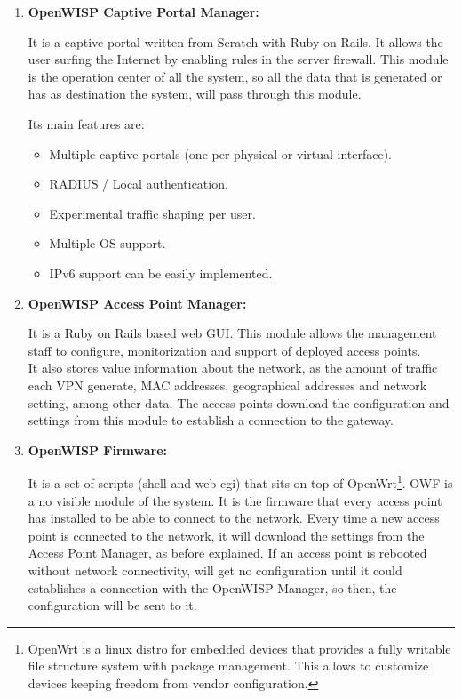 \documentclass[draftclsnofoot,12pt,journal,onecolumn]{IEEEtran}
\begin{document}
\begin{enumerate}
\item[\fbox{3}]\textbf{OpenWISP Captive Portal Manager:}

It is a captive portal written from Scratch with Ruby on Rails. It allows the user surfing the Internet by enabling rules in the server firewall. This module is the operation center of all the system, so all the data that is generated or has as destination the system, will pass through this module. 

Its main features are:
\begin{itemize}
\item Multiple captive portals (one per physical or virtual interface).
\item RADIUS / Local authentication.
\item Experimental traffic shaping per user.
\item Multiple OS support.
\item IPv6 support can be easily implemented.
\end{itemize}


\item[\fbox{4}]\textbf{OpenWISP Access Point Manager:}

It is a Ruby on Rails based web GUI. This module allows the management staff to configure, monitorization and support of deployed access points.\\ It also stores value information about the network, as the amount of traffic each VPN generate, MAC addresses, geographical addresses and network setting, among other data. The access points download the configuration and settings from this module to establish a connection to the gateway.  


\item[\fbox{5}]\textbf{OpenWISP Firmware:}

It is a set of scripts (shell and web cgi) that sits on top of OpenWrt\footnote{OpenWrt is a linux distro for embedded devices that provides a fully writable file structure system with package management. This allows to customize devices keeping freedom from vendor configuration.}. OWF is a no visible module of the system. It is the firmware that every access point has installed to be able to connect to the network. Every time a new access point is connected to the network, it will download the settings from the Access Point Manager, as before explained. If an access point is rebooted without network connectivity, will get no configuration until it could establishes a connection with the OpenWISP Manager, so then, the configuration will be sent to it. 


\end{enumerate}
\end{document}
